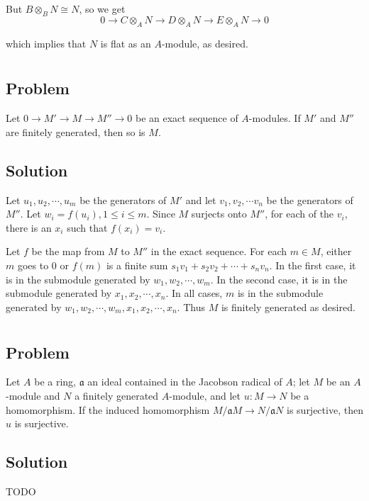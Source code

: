 \documentclass[book,12pt,oneside,openany]{memoir}
\begin{document}
But $B \otimes_B N \cong N$, so we get 
 \[0 \rightarrow C \otimes_A  N \rightarrow D \otimes_A N \rightarrow E \otimes_A  N \rightarrow 0\] 

which implies that $N$ is flat as an $A$-module, as desired.
\section{}
\subsection{Problem}
Let $0 \rightarrow M' \rightarrow M \rightarrow M'' \rightarrow 0$ be an exact sequence of $A$-modules. If $M'$ and $M''$ are finitely generated, then so is $M$.

\subsection{Solution}
Let $u_1, u_2, \cdots, u_m$ be the generators of $M'$ and let $v_1, v_2, \cdots v_n$ be the generators of $M''$. Let $w_i = f(u_i), 1 \leq i \leq m$. Since $M$ surjects onto $M''$, for each of the $v_i$, there is an $x_i$ such that $f(x_i) = v_i$.

Let $f$ be the map from $M$ to $M''$ in the exact sequence. For each $m \in M$, either $m$ goes to 0 or $f(m)$ is a finite sum $s_1 v_1 + s_2 v_2 + \cdots + s_n v_n$. In the first case, it is in the submodule generated by $w_1, w_2, \cdots, w_m$. In the second case, it is in the submodule generated by $x_1, x_2, \cdots, x_n$. In all cases, $m$ is in the submodule generated by $w_1, w_2, \cdots, w_m, x_1, x_2, \cdots, x_n$. Thus $M$ is finitely generated as desired.

\section{}
\subsection{Problem}
Let $A$ be a ring, $\mathfrak{a}$ an ideal contained in the Jacobson radical of $A$; let $M$ be an $A$-module and $N$ a finitely generated $A$-module, and let $u: M \rightarrow N$ be a homomorphism. If the induced homomorphism $M/\mathfrak{a}M \rightarrow N/\mathfrak{a}N$ is surjective, then $u$ is surjective.

\subsection{Solution}
TODO
\end{document}

